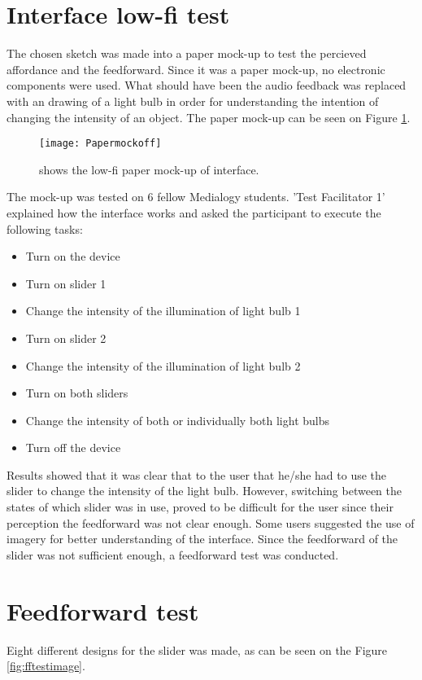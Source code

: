 \section{Interface low-fi test}\label{sec:lowfitest}
The chosen sketch was made into a paper mock-up to test the percieved affordance and the feedforward. Since it was a paper mock-up, no electronic components were used. What should have been the audio feedback was replaced with an drawing of a light bulb in order for understanding the intention of changing the intensity of an object. The paper mock-up can be seen on Figure \ref{fig:Papermockoff}.

\begin{figure}[!h] 
\centering
\texttt{[image: Papermockoff]}
\caption{\label{fig:Papermockoff} shows the low-fi paper mock-up of interface.}
\end{figure}

The mock-up was tested on 6 fellow Medialogy students. 'Test Facilitator 1' explained how the interface works and asked the participant to execute the following tasks:

\begin{itemize}
\item Turn on the device
\item Turn on slider 1
\item Change the intensity of the illumination of light bulb 1
\item Turn on slider 2
\item Change the intensity of the illumination of light bulb 2
\item Turn on both sliders
\item Change the intensity of both or individually both light bulbs
\item Turn off the device
\end{itemize}

Results showed that it was clear that to the user that he/she had to use the slider to change the intensity of the light bulb. However, switching between the states of which slider was in use, proved to be difficult for the user since their perception the feedforward was not clear enough. Some users suggested the use of imagery for better understanding of the interface. Since the feedforward of the slider was not sufficient enough, a feedforward test was conducted.

\section{Feedforward test}\label{sec:fftest}
Eight different designs for the slider was made, as can be seen on the Figure \ref{fig:fftestimage}.

